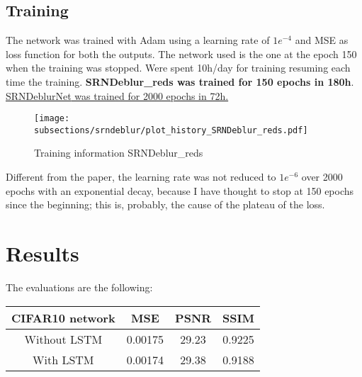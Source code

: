 \subsection{Training}
The network was trained with Adam\cite{adam} using a learning rate of $1e^{-4}$ and MSE as loss function for both the outputs.
The network used is the one at the epoch 150 when the training was stopped.
Were spent 10h/day for training resuming each time the training.
\textbf{SRNDeblur\_reds was trained for 150 epochs in 180h}. \underline{SRN\-DeblurNet\cite{SRN-DeblurNet} was trained for 2000 epochs in 72h.}

\begin{figure}[H]
    \centering
    \texttt{[image: subsections/srndeblur/plot\_history\_SRNDeblur\_reds.pdf]}
    \caption{Training information SRNDeblur\_reds}
\end{figure}

Different from the paper, the learning rate was not reduced to $1e^{-6}$ over 2000 epochs with an exponential decay, because  I have thought to stop at 150 epochs since the beginning; this is, probably, the cause of the plateau of the loss.

\section{Results}
The evaluations are the following:

\begin{tabularx}{300pt}{cccc}
            CIFAR10 network & MSE & PSNR & SSIM \\
            \hline
            \textnormal{Without LSTM} & 0.00175 & 29.23 & 0.9225 \\
            \textnormal{With LSTM} & 0.00174 & 29.38 & 0.9188 \\
            \hline
\end{tabularx}

